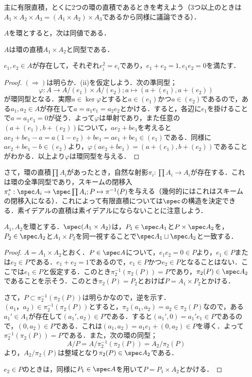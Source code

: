 主に有限直積，とくに2つの環の直積であるときを考えよう（3つ以上のときは$A_1\times A_2\times A_3=(A_1\times A_2)\times A_3$であるから同様に議論できる）．

\begin{prop}
	$A$を環とすると，次は同値である．
	\begin{sakura}
		\item $A$は環の直積$A_1\times A_2$と同型である．
		\item $e_1,e_2\in A$が存在して，それぞれ$e_i^2=e_i$であり，$e_1+e_2=1,e_1e_2=0$を満たす．
	\end{sakura}
\end{prop}

\begin{proof}
	$(\Longrightarrow)$は明らか．(ii)を仮定しよう．次の準同型；
	\[\varphi:A\to A/(e_1)\times A/(e_2);a\mapsto (a+(e_1),a+(e_2))\]
	が環同型となる．実際$a\in\ker\varphi$とすると$a\in (e_1)$かつ$a\in (e_2)$であるので，ある$a_1,a_2\in A$が存在して$a=a_1e_1=a_2e_2$とかける．すると，各辺に$e_1$を掛けることで$a=a_1e_1=0$が従う．よって$\varphi$は単射であり，また任意の$(a+(e_1),b+(e_2))$について，$ae_2+be_1$を考えると$ae_2+be_1-a=a(1-e_2)+be_1=ae_1+be_1\in (e_1)$である．同様に$ae_2+be_1-b\in (e_2)$より，$\varphi(ae_2+be_1)=(a+(e_1),b+(e_2))$であることがわかる．以上より$\varphi$は環同型を与える．
\end{proof}

さて，環の直積$\prod A_i$があったとき，自然な射影$\pi_i:\prod A_i\to A_i$が存在する．これは環の全準同型であり，スキームの閉移入$\pi_i^\ast:\spec A_i\to\spec\prod A_i;P\mapsto \pi^{-1}(P)$を与える（幾何的にはこれはスキームの閉移入になる）．これによって有限直積については$\spec$の構造を決定できる．素イデアルの直積は素イデアルにならないことに注意しよう．
\begin{prop}\label{prop:直積環のspec}
	$A_1,A_2$を環とする．$\spec (A_1\times A_2)$は，$P_1\in\spec A_1$と$P\times \spec A_2$を，$P_2\in\spec A_2$と$A_1\times P_2$を同一視することで$\spec A_1\sqcup\spec A_2$と一致する．
\end{prop}

\begin{proof}
	$A=A_1\times A_2$とおく．$P\in\spec A$について，$e_1e_2=0\in P$より，$e_1\in P$または$e_2\in P$である．$e_1+e_2=1$であるので，$e_1\in P$かつ$e_2\in P$となることはない．ここでは$e_1\in P$と仮定する．このとき$\pi_2^{-1}(\pi_2(P))=P$であり，$\pi_2(P)\in\spec A_2$であることを示そう．このとき$\pi_2(P)=P_2$とおけば$P=A_1\times P_2$とかける．
	
	さて，$P\subset\pi_2^{-1}(\pi_2(P))$は明らかなので，逆を示す．$(a_1，a_2)
	\in\pi_2^{-1}(\pi_2(P))$とすると，$\pi_2(a_1,a_2)=a_2\in\pi_2(P)$なので，ある$a_1'\in A_1$が存在して$(a_1',a_2)\in P$である．すると$(a_1',0)=a_1'e_1\in P$であるので，$(0,a_2)\in P$である．これは$(a_1,a_2)=a_1e_1+(0,a_2)\in P$を導く．よって$\pi_2^{-1}(\pi_2(P))=P$である．また，次の環の同型；
	\[A/P=A/\pi_2^{-1}(\pi_2(P))=A_2/\pi_2(P)\]
	より，$A_2/\pi_2(P)$は整域となり$\pi_2(P)\in\spec A_2$である．
	
	$e_2\in P$のときは，同様に$P_1\in\spec A$を用いて$P=P_1\times A_2$とかける．
\end{proof}

